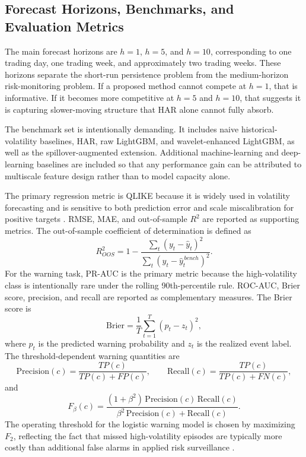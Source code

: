 \subsection{Forecast Horizons, Benchmarks, and Evaluation Metrics}

The main forecast horizons are \(h=1\), \(h=5\), and \(h=10\), corresponding to one trading day, one trading week, and approximately two trading weeks. These horizons separate the short-run persistence problem from the medium-horizon risk-monitoring problem. If a proposed method cannot compete at \(h=1\), that is informative. If it becomes more competitive at \(h=5\) and \(h=10\), that suggests it is capturing slower-moving structure that HAR alone cannot fully absorb.

The benchmark set is intentionally demanding. It includes naive historical-volatility baselines, HAR, raw LightGBM, and wavelet-enhanced LightGBM, as well as the spillover-augmented extension. Additional machine-learning and deep-learning baselines are included so that any performance gain can be attributed to multiscale feature design rather than to model capacity alone.

The primary regression metric is QLIKE because it is widely used in volatility forecasting and is sensitive to both prediction error and scale miscalibration for positive targets \cite{patton2011proxy}. RMSE, MAE, and out-of-sample \(R^2\) are reported as supporting metrics. The out-of-sample coefficient of determination is defined as
\[
R^2_{OOS}
=
1-
\frac{\sum_t (y_t-\hat y_t)^2}
{\sum_t (y_t-\hat y_t^{\,bench})^2}.
\]
For the warning task, PR-AUC is the primary metric because the high-volatility class is intentionally rare under the rolling 90th-percentile rule. ROC-AUC, Brier score, precision, and recall are reported as complementary measures. The Brier score is
\[
\text{Brier}
=
\frac{1}{T}\sum_{t=1}^{T}(p_t-z_t)^2,
\]
where \(p_t\) is the predicted warning probability and \(z_t\) is the realized event label. The threshold-dependent warning quantities are
\[
\text{Precision}(c)=\frac{TP(c)}{TP(c)+FP(c)},
\qquad
\text{Recall}(c)=\frac{TP(c)}{TP(c)+FN(c)},
\]
and
\[
F_{\beta}(c)=
\frac{(1+\beta^2)\,\text{Precision}(c)\,\text{Recall}(c)}
{\beta^2\,\text{Precision}(c)+\text{Recall}(c)}.
\]
The operating threshold for the logistic warning model is chosen by maximizing \(F_2\), reflecting the fact that missed high-volatility episodes are typically more costly than additional false alarms in applied risk surveillance \cite{saito2015prauc}.

